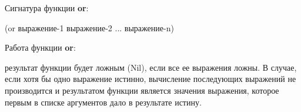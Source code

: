 \documentclass[12pt]{report}
\begin{document}
Сигнатура функции \textbf{or}: 

(or выражение-1 выражение-2 ... выражение-n)\newline

Работа функции \textbf{or}: 

результат функции будет ложным (Nil), если все ее выражения ложны. В случае, если хотя бы одно выражение истинно, вычисление последующих выражений не производится и результатом функции является значения выражения, которое первым в списке аргументов дало в результате истину.\newline
	
	
	
	
\end{document}
